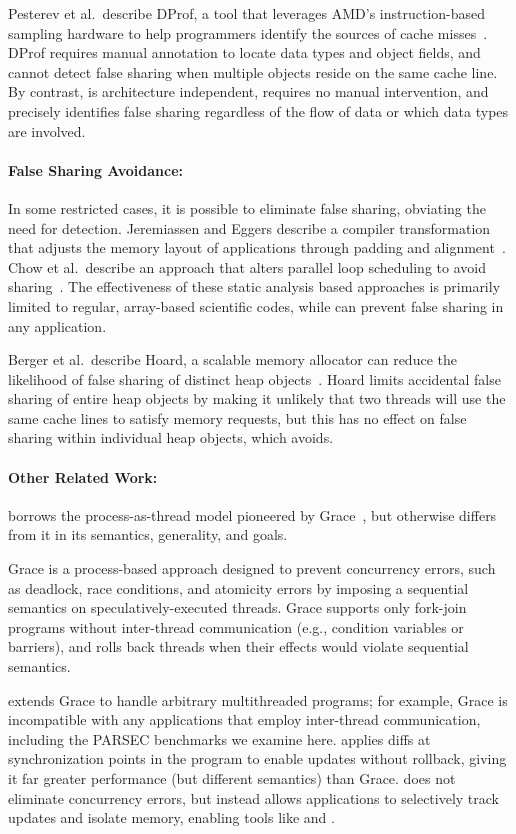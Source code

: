 Pesterev et al.\ describe DProf, a tool that leverages AMD's
instruction-based sampling hardware to help programmers identify the
sources of cache misses~\cite{DProf}. DProf requires manual annotation
to locate data types and object fields, and cannot detect false
sharing when multiple objects reside on the same cache line. By
contrast, \sheriffdetect{} is architecture independent, requires no
manual intervention, and precisely identifies false sharing regardless
of the flow of data or which data types are involved.

\paragraph{False Sharing Avoidance: }
In some restricted cases, it is possible to eliminate false sharing,
obviating the need for detection. Jeremiassen and Eggers describe a
compiler transformation that adjusts the memory layout of applications
through padding and alignment~\cite{falseshare:compile}.  Chow et al.\
describe an approach that alters parallel loop scheduling to avoid
sharing~\cite{falseshare:schedule}. The effectiveness of these
static analysis based approaches is primarily limited to regular,
array-based scientific codes, while \sheriffprotect{} can prevent false
sharing in any application.

Berger et al.\ describe Hoard, a scalable memory allocator can reduce
the likelihood of false sharing of distinct heap
objects~\cite{BergerMcKinleyBlumofeWilson:ASPLOS2000}. Hoard limits
accidental false sharing of entire heap objects by making it unlikely
that two threads will use the same cache lines to satisfy memory
requests, but this has no effect on false sharing within individual heap
objects, which \sheriffprotect{} avoids.

\paragraph{Other Related Work:}
\sheriff{} borrows the
process-as-thread model pioneered by Grace~\cite{grace}, but otherwise
differs from it in its semantics, generality, and goals.

Grace is a process-based approach designed to prevent concurrency
errors, such as deadlock, race conditions, and atomicity errors by
imposing a sequential semantics on speculatively-executed
threads. Grace supports only fork-join programs without inter-thread
communication (e.g., condition variables or barriers), and rolls back
threads when their effects would violate sequential semantics.

\sheriff{} extends Grace to handle
arbitrary multithreaded programs; for example, Grace is incompatible
with any applications that employ inter-thread communication,
including the PARSEC benchmarks we examine here. \sheriff{} applies
diffs at synchronization points in the program to enable updates
without rollback, giving it far greater performance (but different
semantics) than Grace. \sheriff{} does not eliminate concurrency
errors, but instead allows applications to selectively track updates
and isolate memory, enabling tools like \sheriffdetect{}
and \sheriffprotect{}.
